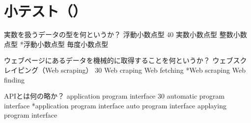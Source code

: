 \newcommand{\Release}{}
\newcommand{\Slide}{}
\newcommand{\PrintLecture}{1}
\newcommand{\PrintSolution}{0}







\maketitle

\section{小テスト（\MyClass）}

\begin{quiz}{\MyClass}


\QuizMultipleChoices
{
  実数を扱うデータの型を何というか？ 
}
{
  浮動小数点型
}
{40}
{ 実数小数点型}
{ 整数小数点型}
{*浮動小数点型}
{ 毎度小数点型}

\QuizMultipleChoices
{
  ウェブページにあるデータを機械的に取得することを何というか？ 
}
{
  ウェブスクレイピング（Web scraping）
}
{30}
{ Web craping}
{ Web fetching}
{*Web scraping}
{ Web finding}

\QuizMultipleChoices
{
  APIとは何の略か？ 
}
{
  application program interface
}
{30}
{ automatic program interface}
{*application program interface}
{ auto program interface}
{ applaying program interface}

\end{quiz}


